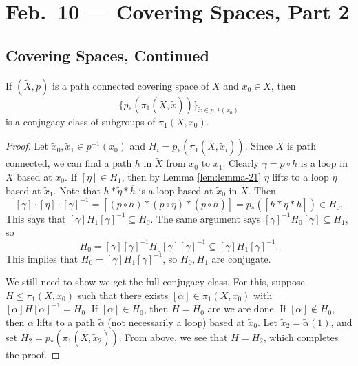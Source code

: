 \chapter{Feb.~10 --- Covering Spaces, Part 2}

\section{Covering Spaces, Continued}

\begin{lemma}
  If $(\widetilde{X}, p)$ is a path connected covering
  space of $X$ and $x_0 \in X$, then
  \[
    \{p_*(\pi_1(\widetilde{X}, \widetilde{x}))\}_{\widetilde{x} \in p^{-1}(x_0)}
  \]
  is a conjugacy class of subgroups of $\pi_1(X, x_0)$.
\end{lemma}

\begin{proof}
  Let $\widetilde{x}_0, \widetilde{x}_1 \in p^{-1}(x_0)$
  and $H_i = p_*(\pi_1(\widetilde{X}, \widetilde{x}_i))$.
  Since $\widetilde{X}$ is path connected, we can find a
  path $h$ in $\widetilde{X}$ from $\widetilde{x}_0$ to
  $\widetilde{x}_1$. Clearly $\gamma = p \circ h$ is a
  loop in $X$ based at $x_0$. If $[\eta] \in H_1$, then by
  Lemma \ref{lem:lemma-21} $\eta$ lifts to a loop
  $\widetilde{\eta}$ based at $\widetilde{x}_1$.
  Note that $h * \widetilde{\eta} * \overline{h}$ is a
  loop based at $\widetilde{x}_0$ in $\widetilde{X}$. Then
  \[
    [\gamma] \cdot [\eta] \cdot [\gamma]^{-1}
    = [(p \circ h) * (p \circ \widetilde{\eta}) * (p \circ \overline{h})]
    = p_*([h * \widetilde{\eta} * \overline{h}])
    \in H_0.
  \] 
  This says that $[\gamma] H_1 [\gamma]^{-1} \subseteq H_0$.
  The same argument says
  $[\gamma]^{-1} H_0 [\gamma] \subseteq H_1$, so
  \[
    H_0 = [\gamma] [\gamma]^{-1} H_0 [\gamma] [\gamma]^{-1}
    \subseteq [\gamma] H_1 [\gamma]^{-1}.
  \]
  This implies that $H_0 = [\gamma] H_1 [\gamma]^{-1}$, so
  $H_0, H_1$ are conjugate.

  We still need to show we
  get the full conjugacy class.
  For this, suppose $H \le \pi_1(X, x_0)$ such that
  there exists $[\alpha] \in \pi_1(X, x_0)$ with
  $[\alpha] H [\alpha]^{-1} = H_0$. If $[\alpha] \in H_0$,
  then $H = H_0$ are we are done. If $[\alpha] \notin H_0$,
  then $\alpha$ lifts to a path $\widetilde{\alpha}$ (not
  necessarily a loop) based at $\widetilde{x}_0$.
  Let $\widetilde{x}_2 = \widetilde{\alpha}(1)$, and set
  $H_2 = p_*(\pi_1(\widetilde{X}, \widetilde{x}_2))$.
  From above, we see that $H = H_2$, which completes the
  proof.
\end{proof}

